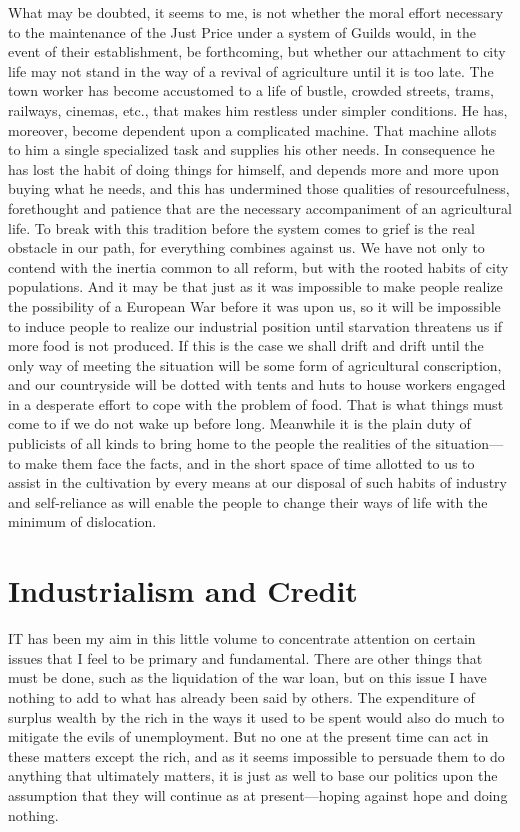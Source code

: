 \documentclass{book}
\begin{document}
What may be doubted, it seems to me, is not whether the moral effort necessary to the maintenance of the Just Price under a system of Guilds would, in the event of their establishment, be forthcoming, but whether our attachment to city life may not stand in the way of a revival of agriculture until it is too late. The town worker has become accustomed to a life of bustle, crowded streets, trams, railways, cinemas, etc., that makes him restless under simpler conditions. He has, moreover, become dependent upon a complicated machine. That machine allots to him a single specialized task and supplies his other needs. In consequence he has lost the habit of doing things for himself, and depends more and more upon buying what he needs, and this has undermined those qualities of resourcefulness, forethought and patience that are the necessary accompaniment of an agricultural life. To break with this tradition before the system comes to grief is the real obstacle in our path, for everything combines against us. We have not only to contend with the inertia common to all reform, but with the rooted habits of city populations. And it may be that just as it was impossible to make people realize the possibility of a European War before it was upon us, so it will be impossible to induce people to realize our industrial position until starvation threatens us if more food is not produced. If this is the case we shall drift and drift until the only way of meeting the situation will be some form of agricultural conscription, and our countryside will be dotted with tents and huts to house workers engaged in a desperate effort to cope with the problem of food. That is what things must come to if we do not wake up before long. Meanwhile it is the plain duty of publicists of all kinds to bring home to the people the realities of the situation—to make them face the facts, and in the short space of time allotted to us to assist in the cultivation by every means at our disposal of such habits of industry and self-reliance as will enable the people to change their ways of life with the minimum of dislocation.

\chapter{Industrialism and Credit}
\label{chapter-12}
IT has been my aim in this little volume to concentrate attention on certain issues that I feel to be primary and fundamental. There are other things that must be done, such as the liquidation of the war loan, but on this issue I have nothing to add to what has already been said by others. The expenditure of surplus wealth by the rich in the ways it used to be spent would also do much to mitigate the evils of unemployment. But no one at the present time can act in these matters except the rich, and as it seems impossible to persuade them to do anything that ultimately matters, it is just as well to base our politics upon the assumption that they will continue as at present—hoping against hope and doing nothing.
\end{document}
